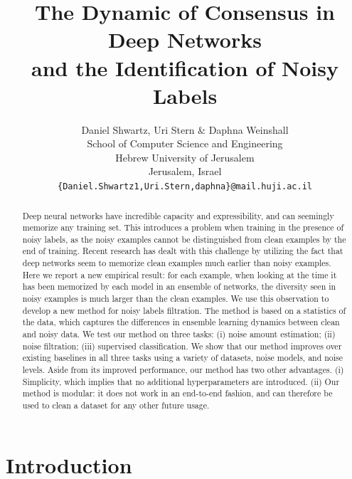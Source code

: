 \documentclass{article}
\title{\centering The Dynamic of Consensus in Deep Networks\\ and the Identification of Noisy Labels}
\author{Daniel Shwartz, Uri Stern \& Daphna Weinshall\\
School of Computer Science and Engineering\\
Hebrew University of Jerusalem\\
Jerusalem, Israel \\
\texttt{\{Daniel.Shwartz1,Uri.Stern,daphna\}@mail.huji.ac.il} \\
}
\newcommand{\F}{\mathcal{F}}
\newcommand{\iX}{\mathbb{X}}
\begin{document}
\maketitle


\begin{abstract}

Deep neural networks have incredible capacity and expressibility, and can seemingly memorize any training set. This introduces a problem when training in the presence of noisy labels, as the noisy examples cannot be distinguished from clean examples by the end of training. Recent research has dealt with this challenge by utilizing the fact that deep networks seem to memorize clean examples much earlier than noisy examples. Here we report a new empirical result: for each example, when looking at the time it has been memorized by each model in an ensemble of networks, the diversity seen in noisy examples is much larger than the clean examples. We use this observation to develop a new method for noisy labels filtration. The method is based on a statistics of the data, which captures the differences in ensemble learning dynamics between clean and noisy data. We test our method on three tasks: (i) noise amount estimation; (ii) noise filtration; (iii) supervised classification. We show that our method improves over existing baselines in all three tasks using a variety of datasets, noise models, and noise levels. Aside from its improved performance, our method has two other advantages. (i) Simplicity, which implies that no additional hyperparameters are introduced. (ii) Our method is modular: it does not work in an end-to-end fashion, and can therefore be used to clean a dataset for any other future usage.

\end{abstract}

\section{Introduction}
\label{sec:intro}

\end{document}
